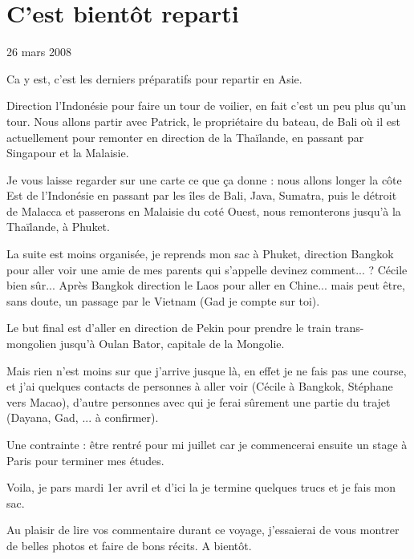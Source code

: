 \section{C'est bientôt reparti}

26 mars 2008

\begin{multicols}{2}

Ca y est, c'est les derniers préparatifs pour repartir en Asie.

Direction l'Indonésie pour faire un tour de voilier, en fait c'est un peu plus qu'un tour. Nous allons partir avec Patrick, le propriétaire du bateau, de Bali où il est actuellement pour remonter en direction de la Thaïlande, en passant par Singapour et la Malaisie.

Je vous laisse regarder sur une carte ce que ça donne : nous allons longer la côte Est de l'Indonésie en passant par les îles de Bali, Java, Sumatra, puis le détroit de Malacca et passerons en Malaisie du coté Ouest, nous remonterons jusqu'à la Thaïlande, à Phuket.


La suite est moins organisée, je reprends mon sac à Phuket, direction Bangkok pour aller voir une amie de mes parents qui s'appelle devinez comment... ? Cécile bien sûr... Après Bangkok direction le Laos pour aller en Chine... mais peut être, sans doute, un passage par le Vietnam (Gad je compte sur toi).

Le but final est d'aller en direction de Pekin pour prendre le train trans-mongolien jusqu'à Oulan Bator, capitale de la Mongolie.

Mais rien n'est moins sur que j'arrive jusque là, en effet je ne fais pas une course, et j'ai quelques contacts de personnes à aller voir (Cécile à Bangkok, Stéphane vers Macao), d'autre personnes avec qui je ferai sûrement une partie du trajet (Dayana, Gad, ... à confirmer).

Une contrainte : être rentré pour mi juillet car je commencerai ensuite un stage à Paris pour terminer mes études.

Voila, je pars mardi 1er avril et d'ici la je termine quelques trucs et je fais mon sac.

Au plaisir de lire vos commentaire durant ce voyage, j'essaierai de vous montrer de belles photos et faire de bons récits. A bientôt.

\end{multicols}


